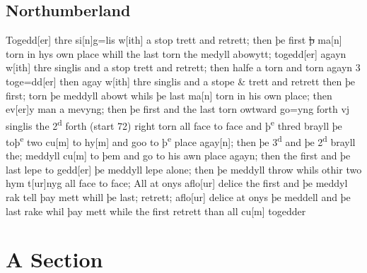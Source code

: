 \documentclass[12pt,letter]{article} %
\newcommand{\srcpg}[1]{(start #1)}
\begin{document}
\subsection{Northumberland}
Togedd{[}er{]} thre si{[}n{]}g=lis w{[}ith{]} a stop trett and retrett;
then þe first \sout{þ} ma{[}n{]} torn in hys own place whill the last
torn the medyll abowytt; togedd{[}er{]} agayn w{[}ith{]} thre singlis
and a stop trett and retrett; then halfe a torn and torn agayn 3
toge=dd{[}er{]} then agay w{[}ith{]} thre singlis and a stope \& trett
and retrett then þe first; torn þe meddyll abowt whils þe last ma{[}n{]}
torn in his own place; then ev{[}er{]}y man a mevyng; then þe first and
the last torn owtward go=yng forth vj singlis the 2\textsuperscript{d}
forth \srcpg{72} right torn all face to face and þ\textsuperscript{e}
thred brayll þe toþ\textsuperscript{e} two cu{[}m{]} to hy{[}m{]} and
goo to þ\textsuperscript{e} place agay{[}n{]}; then þe
3\textsuperscript{d} and þe 2\textsuperscript{d} brayll the; meddyll
cu{[}m{]} to þem and go to his awn place agayn; then the first and þe
last lepe to gedd{[}er{]} þe meddyll lepe alone; then þe meddyll throw
whils othir two hym t{[}ur{]}nyg all face to face; All at onys
aflo{[}ur{]} delice the first and þe meddyl rak tell þay mett whill þe
last; retrett; aflo{[}ur{]} delice at onys þe meddell and þe last rake
whil þay mett while the first retrett than all cu{[}m{]} togedder

\newpage

    \section{A Section}
    \lipsum[1]
    
    \nocite{*}
    
    
\end{document}
